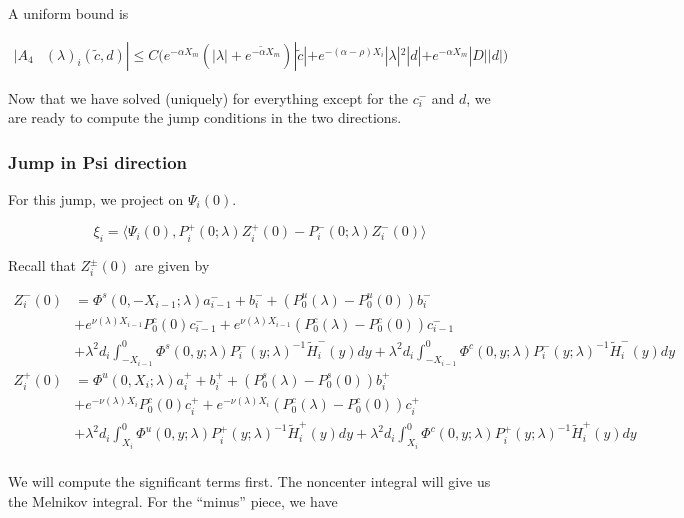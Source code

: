 \documentclass[12pt]{article}
\begin{document}
A uniform bound is

\begin{align*}
|A_4&(\lambda)_i(\tilde{c}, d)|
\leq C \Big( 
e^{-\alpha X_m} (|\lambda| + e^{-\tilde{\alpha}X_m})|\tilde{c}|
+ e^{-(\alpha - \rho) X_i} |\lambda|^2|d| + e^{-\alpha X_m}|D||d| \Big)
\end{align*} 

Now that we have solved (uniquely) for everything except for the $c_i^-$ and $d$, we are ready to compute the jump conditions in the two directions.

\subsubsection*{Jump in Psi direction}

For this jump, we project on $\Psi_i(0)$.

\[
\xi_i = \langle \Psi_i(0), P_i^+(0; \lambda) Z_i^+(0) - P_i^-(0; \lambda) Z_i^-(0) \rangle
\]

Recall that $Z_i^\pm(0)$ are given by

\begin{align*}
Z_i^-(0) &= \Phi^s(0, -X_{i-1}; \lambda) a_{i-1}^- + b_i^- + (P_0^u(\lambda) - P_0^u(0))b_i^- \\
&+ e^{\nu(\lambda) X_{i-1}} P_0^c(0) c_{i-1}^- + e^{\nu(\lambda) X_{i-1}} (P_0^c(\lambda) - P_0^c(0))c_{i-1}^- \\
&+ \lambda^2 d_i \int_{-X_{i-1}}^0 \Phi^s(0, y; \lambda) P_i^-(y; \lambda)^{-1} \tilde{H}_i^-(y) dy 
+ \lambda^2 d_i \int_{-X_{i-1}}^0 \Phi^c(0, y; \lambda) P_i^-(y; \lambda)^{-1} \tilde{H}_i^-(y) dy  \\ 
Z_i^+(0) &= \Phi^u(0, X_i; \lambda) a_i^+ + b_i^+ + (P_0^s(\lambda) - P_0^s(0)) b_i^+ \\
&+ e^{-\nu(\lambda)X_i} P_0^c(0) c_i^+ + e^{-\nu(\lambda)X_i} (P_0^c(\lambda) - P_0^c(0))c_i^+ \\
&+ \lambda^2 d_i \int_{X_i}^0 \Phi^u(0, y; \lambda) P_i^+(y; \lambda)^{-1} \tilde{H}_i^+(y) dy 
+ \lambda^2 d_i \int_{X_i}^0 \Phi^c(0, y; \lambda) P_i^+(y; \lambda)^{-1} \tilde{H}_i^+(y) dy \\
\end{align*}

We will compute the significant terms first. The noncenter integral will give us the Melnikov integral. For the ``minus'' piece, we have
\end{document}
